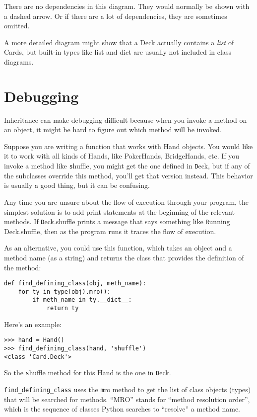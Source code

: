 \documentclass[
DIV=11,
fontsize=12,
twoside,
headinclude=false,
titlepage=firstiscover,
abstract=true,
headsepline=true,
footsepline=true,
chapterprefix=true, %
headings=big,
bibliography=totoc,%
captions=tableheading
]{scrbook}
\theoremstyle{definition}
\begin{document}
There are no dependencies in this diagram.  They would normally
be shown with a dashed arrow.  Or if there are a lot of
dependencies, they are sometimes omitted.

A more detailed diagram might show that a Deck actually
contains a {\em list} of Cards, but built-in types
like list and dict are usually not included in class diagrams.


\section{Debugging}

Inheritance can make debugging difficult because when you invoke a
method on an object, it might be hard to figure out which method will
be invoked.  

Suppose you are writing a function that works with Hand objects.
You would like it to work with all kinds of Hands, like
PokerHands, BridgeHands, etc.  If you invoke a method like
{\texttt shuffle}, you might get the one defined in {\texttt Deck},
but if any of the subclasses override this method, you'll
get that version instead.  This behavior is usually a good
thing, but it can be confusing.

Any time you are unsure about the flow of execution through your
program, the simplest solution is to add print statements at the
beginning of the relevant methods.  If {\texttt Deck.shuffle} prints a
message that says something like {\texttt Running Deck.shuffle}, then as
the program runs it traces the flow of execution.

As an alternative, you could use this function, which takes an
object and a method name (as a string) and returns the class that
provides the definition of the method:

\begin{lstlisting}
def find_defining_class(obj, meth_name):
    for ty in type(obj).mro():
        if meth_name in ty.__dict__:
            return ty
\end{lstlisting}
%
Here's an example:

\begin{lstlisting}
>>> hand = Hand()
>>> find_defining_class(hand, 'shuffle')
<class 'Card.Deck'>
\end{lstlisting}
%
So the {\texttt shuffle} method for this Hand is the one in {\texttt Deck}.

\verb"find_defining_class" uses the {\texttt mro} method to get the list
of class objects (types) that will be searched for methods.  ``MRO''
stands for ``method resolution order'', which is the sequence of
classes Python searches to ``resolve'' a method name.
\end{document}
